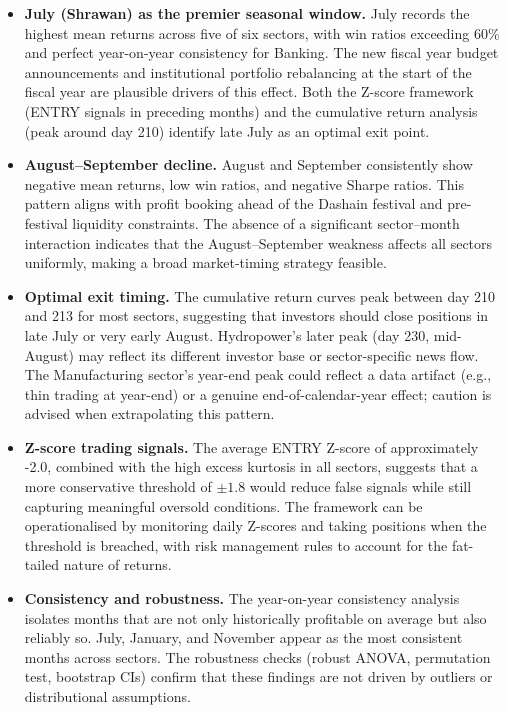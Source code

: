\documentclass[12pt,a4paper,fleqn]{article}
\begin{document}
\begin{itemize}
    \item \textbf{July (Shrawan) as the premier seasonal window.} July records the highest mean returns across five of six sectors, with win ratios exceeding 60\% and perfect year-on-year consistency for Banking. The new fiscal year budget announcements and institutional portfolio rebalancing at the start of the fiscal year are plausible drivers of this effect. Both the Z-score framework (ENTRY signals in preceding months) and the cumulative return analysis (peak around day 210) identify late July as an optimal exit point.
    
    \item \textbf{August–September decline.} August and September consistently show negative mean returns, low win ratios, and negative Sharpe ratios. This pattern aligns with profit booking ahead of the Dashain festival and pre-festival liquidity constraints. The absence of a significant sector–month interaction indicates that the August–September weakness affects all sectors uniformly, making a broad market-timing strategy feasible.
    
    \item \textbf{Optimal exit timing.} The cumulative return curves peak between day 210 and 213 for most sectors, suggesting that investors should close positions in late July or very early August. Hydropower's later peak (day 230, mid-August) may reflect its different investor base or sector-specific news flow. The Manufacturing sector's year-end peak could reflect a data artifact (e.g., thin trading at year-end) or a genuine end-of-calendar-year effect; caution is advised when extrapolating this pattern.
    
    \item \textbf{Z-score trading signals.} The average ENTRY Z-score of approximately -2.0, combined with the high excess kurtosis in all sectors, suggests that a more conservative threshold of \(\pm 1.8\) would reduce false signals while still capturing meaningful oversold conditions. The framework can be operationalised by monitoring daily Z-scores and taking positions when the threshold is breached, with risk management rules to account for the fat-tailed nature of returns.
    
    \item \textbf{Consistency and robustness.} The year-on-year consistency analysis isolates months that are not only historically profitable on average but also reliably so. July, January, and November appear as the most consistent months across sectors. The robustness checks (robust ANOVA, permutation test, bootstrap CIs) confirm that these findings are not driven by outliers or distributional assumptions.
    

\end{itemize}
\end{document}
